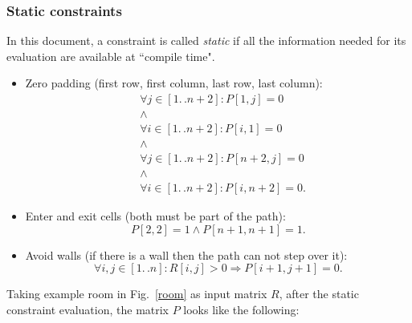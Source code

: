 \documentclass[12pt]{article}
\newcommand*{\itc}{\mathrel{:}} %
\newcommand*{\twodots}{\mathrel{. \, .}}
\begin{document}
\subsubsection{Static constraints}
In this document, a constraint is called \emph{static} if all the information
needed for its evaluation are available at ``compile time".
\begin{itemize}
  \item
  Zero padding (first row, first column, last row, last column):
  \begin{align*}
    &\forall j \in [1 \twodots n+2] \itc P[1,j] = 0 \\
      &\wedge \\
    &\forall i  \in [1 \twodots n+2] \itc P[i,1] = 0 \\
      &\wedge\\
    &\forall j \in [1 \twodots n+2] \itc P[n+2,j] = 0 \\
      &\wedge\\
    &\forall i \in [1 \twodots n+2] \itc P[i,n+2] = 0.
  \end{align*}
  \item
  Enter and exit cells (both must be part of the path):
  \[
    P[2,2] = 1 \wedge P[n+1, n+1] = 1.
  \]
  \item
  Avoid walls (if there is a wall then the path can not step over it):
  \[
    \forall i, j \in [1 \twodots n] \itc R[i, j] > 0
    \Longrightarrow
    P[i+1,j+1] = 0.
  \]
\end{itemize}
Taking example room in Fig.~\ref{room} as input matrix $R$,
after the static constraint evaluation, the matrix $P$ looks like the following:
\end{document}
